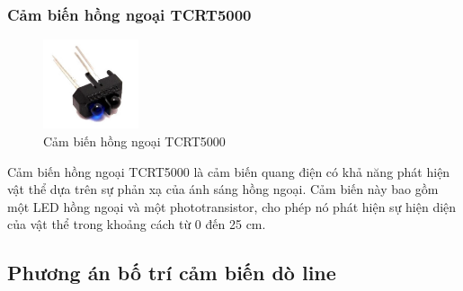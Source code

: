             \subsubsection{Cảm biến hồng ngoại TCRT5000}
                \begin{figure}[H]
                    \centering
                    \includegraphics[width=0.25\textwidth]{pictures/chapter2/chapter2_pic_6.png}
                    \caption{Cảm biến hồng ngoại TCRT5000}
                    \label{fig:tcrt5000}
                \end{figure}
                \hspace*{0.6cm}Cảm biến hồng ngoại TCRT5000 là cảm biến quang điện có khả năng phát hiện vật thể dựa trên sự phản xạ của ánh sáng hồng ngoại. Cảm biến này bao gồm một LED hồng ngoại và một phototransistor, cho phép nó phát hiện sự hiện diện của vật thể trong khoảng cách từ 0 đến 25 cm. 
        \subsection{Phương án bố trí cảm biến dò line}
